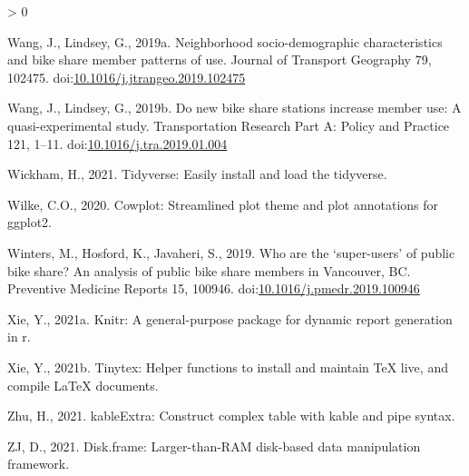 \documentclass[]{elsarticle} %
\newlength{\cslhangindent}
\newenvironment{CSLReferences}[2] %
 {%
  \setlength{\parindent}{0pt}
  \ifodd #1 \everypar{\setlength{\hangindent}{\cslhangindent}}\ignorespaces\fi
  \ifnum #2 > 0
  \setlength{\parskip}{#2\baselineskip}
  \fi
 }%
 {}
\begin{document}
\begin{CSLReferences}{1}{0}
\leavevmode\hypertarget{ref-wangNeighborhoodSociodemographicCharacteristics2019}{}%
Wang, J., Lindsey, G., 2019a. Neighborhood socio-demographic
characteristics and bike share member patterns of use. Journal of
Transport Geography 79, 102475.
doi:\href{https://doi.org/10.1016/j.jtrangeo.2019.102475}{10.1016/j.jtrangeo.2019.102475}

\leavevmode\hypertarget{ref-wangNewBikeShare2019}{}%
Wang, J., Lindsey, G., 2019b. Do new bike share stations increase member
use: {A} quasi-experimental study. Transportation Research Part A:
Policy and Practice 121, 1--11.
doi:\href{https://doi.org/10.1016/j.tra.2019.01.004}{10.1016/j.tra.2019.01.004}

\leavevmode\hypertarget{ref-R-tidyverse}{}%
Wickham, H., 2021. Tidyverse: Easily install and load the tidyverse.

\leavevmode\hypertarget{ref-R-cowplot}{}%
Wilke, C.O., 2020. Cowplot: Streamlined plot theme and plot annotations
for ggplot2.

\leavevmode\hypertarget{ref-wintersWhoAreSuperusers2019}{}%
Winters, M., Hosford, K., Javaheri, S., 2019. Who are the
{`super-users'} of public bike share? {An} analysis of public bike share
members in {Vancouver}, {BC}. Preventive Medicine Reports 15, 100946.
doi:\href{https://doi.org/10.1016/j.pmedr.2019.100946}{10.1016/j.pmedr.2019.100946}

\leavevmode\hypertarget{ref-R-knitr}{}%
Xie, Y., 2021a. Knitr: A general-purpose package for dynamic report
generation in r.

\leavevmode\hypertarget{ref-R-tinytex}{}%
Xie, Y., 2021b. Tinytex: Helper functions to install and maintain TeX
live, and compile LaTeX documents.

\leavevmode\hypertarget{ref-R-kableExtra}{}%
Zhu, H., 2021. kableExtra: Construct complex table with kable and pipe
syntax.

\leavevmode\hypertarget{ref-R-disk.frame}{}%
ZJ, D., 2021. Disk.frame: Larger-than-RAM disk-based data manipulation
framework.

\end{CSLReferences}
\end{document}
